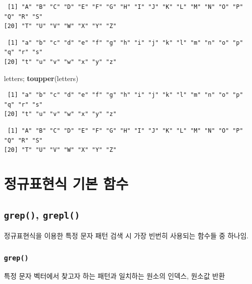 \documentclass[
  11pt,
]{krantz}
\newenvironment{Shaded}{\begin{snugshade}}{\end{snugshade}}
\newcommand{\KeywordTok}[1]{\textcolor[rgb]{0.27,0.27,0.27}{\textbf{#1}}}
\newcommand{\NormalTok}[1]{#1}
\begin{document}
\begin{verbatim}
 [1] "A" "B" "C" "D" "E" "F" "G" "H" "I" "J" "K" "L" "M" "N" "O" "P" "Q" "R" "S"
[20] "T" "U" "V" "W" "X" "Y" "Z"
\end{verbatim}

\begin{verbatim}
 [1] "a" "b" "c" "d" "e" "f" "g" "h" "i" "j" "k" "l" "m" "n" "o" "p" "q" "r" "s"
[20] "t" "u" "v" "w" "x" "y" "z"
\end{verbatim}

\begin{Shaded}
\begin{Highlighting}[]
\NormalTok{letters; }\KeywordTok{toupper}\NormalTok{(letters)}
\end{Highlighting}
\end{Shaded}

\begin{verbatim}
 [1] "a" "b" "c" "d" "e" "f" "g" "h" "i" "j" "k" "l" "m" "n" "o" "p" "q" "r" "s"
[20] "t" "u" "v" "w" "x" "y" "z"
\end{verbatim}

\begin{verbatim}
 [1] "A" "B" "C" "D" "E" "F" "G" "H" "I" "J" "K" "L" "M" "N" "O" "P" "Q" "R" "S"
[20] "T" "U" "V" "W" "X" "Y" "Z"
\end{verbatim}

\normalsize

\hypertarget{regexp-basic-fun}{%
\section{정규표현식 기본 함수}\label{regexp-basic-fun}}

\hypertarget{grep-grepl}{%
\subsection{\texorpdfstring{\textbf{\texttt{grep()}, \texttt{grepl()}}}{grep(), grepl()}}\label{grep-grepl}}

정규표현식을 이용한 특정 문자 패턴 검색 시 가장 빈번히 사용되는 함수들 중 하나임.

\hypertarget{grep}{%
\subsubsection*{\texorpdfstring{\textbf{\texttt{grep()}}}{grep()}}\label{grep}}


특정 문자 벡터에서 찾고자 하는 패턴과 일치하는 원소의 인덱스, 원소값 반환
\end{document}
